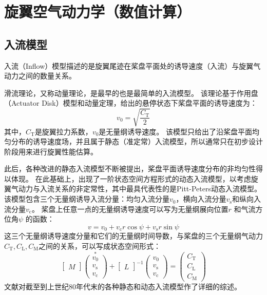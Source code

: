 \documentclass[doctor,openright,twoside,color]{buaathesis}
\begin{document}
\section{旋翼空气动力学（数值计算）}

\subsection{入流模型}
入流（Inflow）模型描述的是旋翼尾迹在桨盘平面处的诱导速度（入流）与旋翼气动力之间的数量关系。

滑流理论，又称动量理论，是最早的也是最简单的入流模型。
该理论基于作用盘（Actuator Disk）模型和动量定理，给出的悬停状态下桨盘平面的诱导速度为：
\begin{equation}
  v_{ \mathrm{0} }  = \sqrt{\frac{C_\mathrm{T}}{2}}
\end{equation}
其中，$C_\mathrm{T}$是旋翼拉力系数，$v_{ \mathrm{0} }$是无量纲诱导速度。
该模型只给出了沿桨盘平面均匀分布的诱导速度场，并且属于静态（准定常）入流模型，所以通常只在初步设计阶段用来进行旋翼性能估算。

此后，各种改进的静态入流模型不断被提出，桨盘平面诱导速度分布的非均匀性得以体现。
在此基础上，出现了一阶状态空间方程形式的动态入流模型，以考虑旋翼气动力与入流关系的非定常性，其中最具代表性的是Pitt-Peters动态入流模型。
该模型包含三个无量纲诱导入流分量：均匀入流分量$v_{\mathrm{0}}$，横向入流分量$v_{\mathrm{s}}$和纵向入流分量$v_{\mathrm{c}}$。
桨盘上任意一点的无量纲诱导速度可以写为无量纲展向位置$r$ 和气流方位角$\psi$ 的函数：
\begin{equation}
v = v_0 + v_{\mathrm{c}} r \cos \psi + v_{\mathrm{s}} r \sin \psi
\end{equation}
这三个无量纲诱导速度分量和它们的无量纲时间导数，与桨盘的三个无量纲气动力$C_{ \mathrm{T} },C_{ \mathrm{L} },C_{ \mathrm{M} }$之间的关系，可以写成状态空间形式：
\begin{equation}
\begin{bmatrix} M \end{bmatrix}
\overset { * }{ \begin{pmatrix} v_{ \mathrm{0} } \\ v_{ \mathrm{s} } \\ v_{ \mathrm{c} } \end{pmatrix} }
+
\begin{bmatrix} L  \end{bmatrix}^ { -1}
\begin{pmatrix} v_{ \mathrm{0} } \\ v_{ \mathrm{s} } \\ v_{ \mathrm{c} } \end{pmatrix}
=
\begin{pmatrix} C_{ \mathrm{T} } \\ C_{ \mathrm{L} } \\ C_{ \mathrm{M} } \end{pmatrix}
\end{equation}
文献\cite{Chen1989}对截至到上世纪80年代末的各种静态和动态入流模型作了详细的综述。
\end{document}
